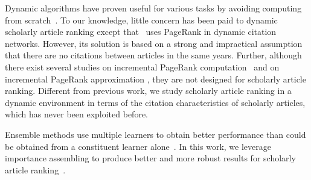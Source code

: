 
Dynamic algorithms have proven useful for various tasks by avoiding computing from scratch~\cite{RamalingamR93}.
To our knowledge, little concern has been paid to dynamic scholarly article ranking except that~\cite{GhoshKHLL11} uses PageRank in dynamic citation networks. However, its solution is based on a strong and impractical assumption that there are no citations between articles in the same years.
Further, although there exist several studies on incremental PageRank computation~\cite{DesikanPSK05,AbiteboulPC03,WuR09} and on incremental PageRank approximation \cite{BahmaniCG10,BahmaniKMU12}, they are not designed for scholarly article ranking.
%
Different from previous work, we study scholarly article ranking in a dynamic environment in terms of
the citation characteristics of scholarly articles, which has never been exploited before.


Ensemble methods use multiple learners to obtain better performance than could be obtained from a constituent learner alone~\cite{zhihua-book}.
In this work, we leverage  importance assembling  to produce better and more robust results for scholarly article ranking~\cite{zhihua-book,wsdmcup,DuanAMHH16}.
